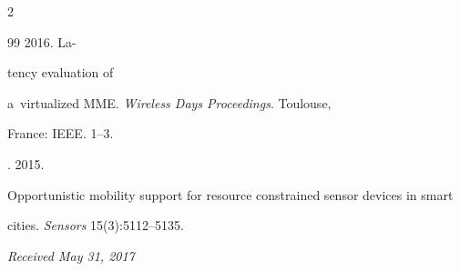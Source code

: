 \begin{multicols}{2}
{{\begin{thebibliography}{99}
 2016. La-\linebreak\vspace*{-11pt}





\columnbreak





\noindent


tency evaluation of 


a~virtualized MME. \textit{Wireless Days Proceedings}. Toulouse, 


France: IEEE. 1--3.




. 2015. 


Opportunistic mobility support for resource constrained sensor devices in smart 


cities. \textit{Sensors} 15(3):5112--5135.


{





}


\end{thebibliography}





 }


 }





\end{multicols}





\vspace*{-6pt}





\hfill{\small\textit{Received May 31, 2017}}










\Contr





\noindent


